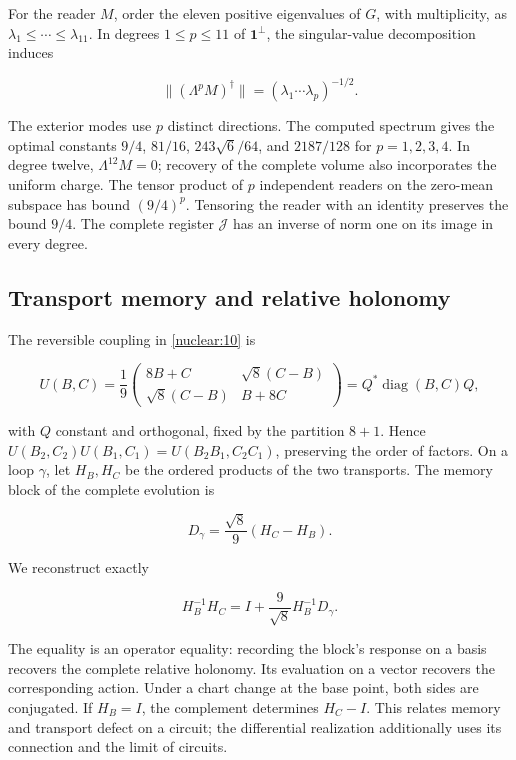 For the reader \(M\), order the eleven positive eigenvalues of \(G\), with multiplicity, as \(\lambda_1\le\cdots\le\lambda_{11}\). In degrees \(1\le p\le11\) of \(\mathbf1^\perp\), the singular-value decomposition induces

\begin{equation}
\|(\Lambda^pM)^\dagger\|
=(\lambda_1\cdots\lambda_p)^{-1/2}.
\label{nuc11:eq:24}
\end{equation}

The exterior modes use \(p\) distinct directions. The computed spectrum gives the optimal constants \(9/4\), \(81/16\), \(243\sqrt6/64\), and \(2187/128\) for \(p=1,2,3,4\). In degree twelve, \(\Lambda^{12}M=0\); recovery of the complete volume also incorporates the uniform charge. The tensor product of \(p\) independent readers on the zero-mean subspace has bound \((9/4)^p\). Tensoring the reader with an identity preserves the bound \(9/4\). The complete register \(\mathcal J\) has an inverse of norm one on its image in every degree.

\subsection{Transport memory and relative holonomy}

The reversible coupling in \cref{nuclear:10} is

\[
U(B,C)=\frac19
\begin{pmatrix}8B+C&\sqrt8(C-B)\\
\sqrt8(C-B)&B+8C\end{pmatrix}
=Q^*\operatorname{diag}(B,C)Q,
\]

with \(Q\) constant and orthogonal, fixed by the partition \(8+1\). Hence \(U(B_2,C_2)U(B_1,C_1)=U(B_2B_1,C_2C_1)\), preserving the order of factors. On a loop \(\gamma\), let \(H_B,H_C\) be the ordered products of the two transports. The memory block of the complete evolution is

\[
D_\gamma=\frac{\sqrt8}{9}(H_C-H_B).
\]

We reconstruct exactly

\begin{equation}
\boxed{H_B^{-1}H_C=I+\frac9{\sqrt8}H_B^{-1}D_\gamma.}
\label{nuc11:eq:25}
\end{equation}

The equality is an operator equality: recording the block's response on a basis recovers the complete relative holonomy. Its evaluation on a vector recovers the corresponding action. Under a chart change at the base point, both sides are conjugated. If \(H_B=I\), the complement determines \(H_C-I\). This relates memory and transport defect on a circuit; the differential realization additionally uses its connection and the limit of circuits.

